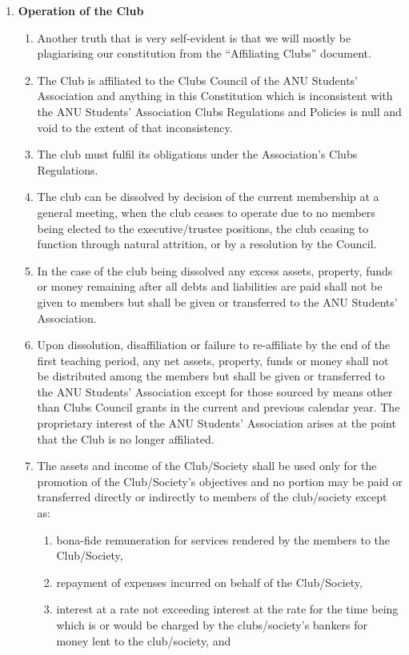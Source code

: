 \documentclass{article}
\begin{document}
\begin{enumerate}[label=\textbf{\arabic*}]
    \item \textbf{Operation of the Club}
    \begin{enumerate}[label=2.\arabic*]
        \item Another truth that is very self-evident is that we will mostly be plagiarising our constitution from the “Affiliating Clubs” document.
        \item The Club is affiliated to the Clubs Council of the ANU Students’ Association and anything in this Constitution which is inconsistent with the ANU Students’ Association Clubs Regulations and Policies is null and void to the extent of that inconsistency.
        \item The club must fulfil its obligations under the Association’s Clubs Regulations.
        \item The club can be dissolved by decision of the current membership at a general meeting, when the club ceases to operate due to no members being elected to the executive/trustee positions, the club ceasing to function through natural attrition, or by a resolution by the Council. 
        \item In the case of the club being dissolved any excess assets, property, funds or money remaining after all debts and liabilities are paid shall not be given to members but shall be given or transferred to the ANU Students’ Association.
        \item Upon dissolution, disaffiliation or failure to re-affiliate by the end of the first teaching period, any net assets, property, funds or money shall not be distributed among the members but shall be given or transferred to the ANU Students’ Association except for those sourced by means other than Clubs Council grants in the current and previous calendar year. The proprietary interest of the ANU Students’ Association arises at the point that the Club is no longer affiliated.
        \item The assets and income of the Club/Society shall be used only for the promotion of the Club/Society’s objectives and no portion may be paid or transferred directly or indirectly to members of the club/society except as:
        \begin{enumerate}[label=\alph*.]
            \item bona-fide remuneration for services rendered by the members to the Club/Society,
            \item repayment of expenses incurred on behalf of the Club/Society,
            \item interest at a rate not exceeding interest at the rate for the time being which is or would be charged by the clubs/society’s bankers for money lent to the club/society, and

\end{enumerate}
\end{enumerate}
\end{enumerate}
\end{document}
